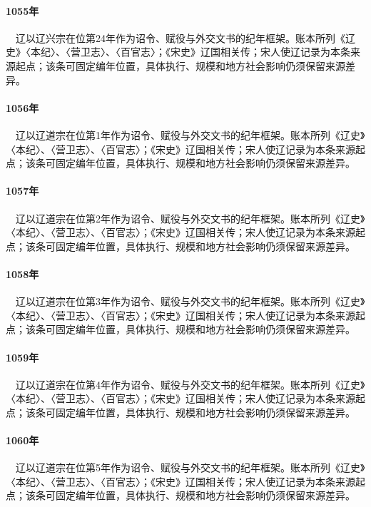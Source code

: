 \paragraph{1055年}　辽以辽兴宗在位第24年作为诏令、赋役与外交文书的纪年框架。账本所列《辽史》〈本纪〉、〈营卫志〉、〈百官志〉；《宋史》辽国相关传；宋人使辽记录为本条来源起点；该条可固定编年位置，具体执行、规模和地方社会影响仍须保留来源差异。

\paragraph{1056年}　辽以辽道宗在位第1年作为诏令、赋役与外交文书的纪年框架。账本所列《辽史》〈本纪〉、〈营卫志〉、〈百官志〉；《宋史》辽国相关传；宋人使辽记录为本条来源起点；该条可固定编年位置，具体执行、规模和地方社会影响仍须保留来源差异。

\paragraph{1057年}　辽以辽道宗在位第2年作为诏令、赋役与外交文书的纪年框架。账本所列《辽史》〈本纪〉、〈营卫志〉、〈百官志〉；《宋史》辽国相关传；宋人使辽记录为本条来源起点；该条可固定编年位置，具体执行、规模和地方社会影响仍须保留来源差异。

\paragraph{1058年}　辽以辽道宗在位第3年作为诏令、赋役与外交文书的纪年框架。账本所列《辽史》〈本纪〉、〈营卫志〉、〈百官志〉；《宋史》辽国相关传；宋人使辽记录为本条来源起点；该条可固定编年位置，具体执行、规模和地方社会影响仍须保留来源差异。

\paragraph{1059年}　辽以辽道宗在位第4年作为诏令、赋役与外交文书的纪年框架。账本所列《辽史》〈本纪〉、〈营卫志〉、〈百官志〉；《宋史》辽国相关传；宋人使辽记录为本条来源起点；该条可固定编年位置，具体执行、规模和地方社会影响仍须保留来源差异。

\paragraph{1060年}　辽以辽道宗在位第5年作为诏令、赋役与外交文书的纪年框架。账本所列《辽史》〈本纪〉、〈营卫志〉、〈百官志〉；《宋史》辽国相关传；宋人使辽记录为本条来源起点；该条可固定编年位置，具体执行、规模和地方社会影响仍须保留来源差异。

